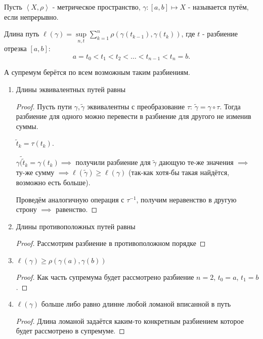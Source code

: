 
\begin{definition} \thmslashn 

    Пусть $\left<X, \rho\right>$ - метрическое пространство, $\gamma : [a, b] \mapsto X$ - называется путём, если непрерывно.

    Длина путь $\ell(\gamma) = \sup\limits_{n, t} \sum\limits_{k=1}^{n} \rho(\gamma(t_{k-1}), \gamma(t_{k}))$, где $t$ - разбиение отрезка $[a, b]$:
    \[ a = t_0 < t_1 < t_2 < \ldots < t_{n-1} < t_{n} = b .\]

    А супремум берётся по всем возможным таким разбиениям.
\end{definition}
\begin{properties} \thmslashn

    \begin{enumerate}
        \item Длины эквивалентных путей равны
            \begin{proof} \thmslashn
            
                Пусть пути $\gamma, \tilde{\gamma}$ эквивалентны с преобразование $\tau$: $\tilde{\gamma} = \gamma \circ \tau$. Тогда разбиение для одного можно перевести в разбиение для другого не изменив суммы.

                $\tilde{t}_{k} = \tau(t_{k})$.
                
                $\tilde{\gamma(\tilde{t}_{k}} = \gamma(t_{k}) \implies $ получили разбиение для $\tilde{\gamma}$ дающую те-же значения $\implies$ ту-же сумму $\implies \ell(\tilde{\gamma}) \ge \ell(\gamma)$ (так-как хотя-бы такая найдётся, возможно есть больше).

                Проведём аналогичную операция с $\tau^{-1}$, получим неравенство в другую строну $\implies$ равенство.

            \end{proof}
        \item Длины противоположных путей равны
            \begin{proof} \thmslashn
            
                Рассмотрим разбиение в противоположном порядке
            \end{proof}
        \item $\ell(\gamma) \ge \rho(\gamma(a), \gamma(b))$
            \begin{proof} \thmslashn
            
                Как часть супремума будет рассмотрено разбиение $n=2$, $t_{0} = a$, $t_{1} = b$.
            \end{proof}
        \item $\ell(\gamma)$ больше либо равно длинне любой ломаной вписанной в путь
            \begin{proof} \thmslashn
            
                Длина ломаной задаётся каким-то конкретным разбиением которое будет рассмотрено в супремуме.
            \end{proof}
    \end{enumerate}
\end{properties}
